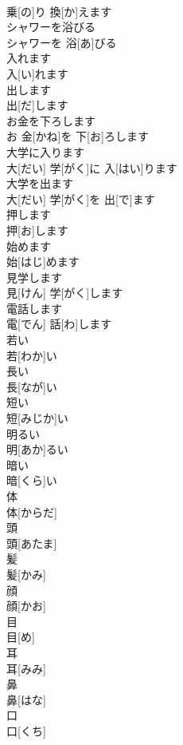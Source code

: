 \documentclass[8pt]{extreport}
\begin{document}
\begin{CJK}{UTF8}{min}
\\	乗[の]り 換[か]えます		
\\	シャワーを浴びる	
\\	シャワーを 浴[あ]びる		
\\	入れます	
\\	入[い]れます		
\\	出します	
\\	出[だ]します		
\\	お金を下ろします	
\\	お 金[かね]を 下[お]ろします		
\\	大学に入ります	
\\	大[だい] 学[がく]に 入[はい]ります		
\\	大学を出ます	
\\	大[だい] 学[がく]を 出[で]ます		
\\	押します	
\\	押[お]します		
\\	始めます	
\\	始[はじ]めます		
\\	見学します	
\\	見[けん] 学[がく]します		
\\	電話します	
\\	電[でん] 話[わ]します		
\\	若い	
\\	若[わか]い		
\\	長い	
\\	長[なが]い		
\\	短い	
\\	短[みじか]い		
\\	明るい	
\\	明[あか]るい		
\\	暗い	
\\	暗[くら]い		
\\	体	
\\	体[からだ]		
\\	頭	
\\	頭[あたま]		
\\	髪	
\\	髪[かみ]		
\\	顔	
\\	顔[かお]		
\\	目	
\\	目[め]		
\\	耳	
\\	耳[みみ]		
\\	鼻	
\\	鼻[はな]		
\\	口	
\\	口[くち]		

\end{CJK}
\end{document}
